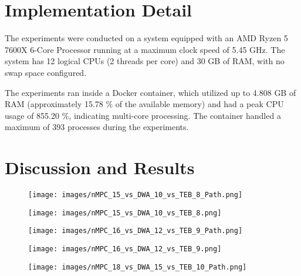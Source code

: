 \documentclass[conference]{IEEEtran}
\begin{document}
\section{Implementation Detail}

The experiments were conducted on a system equipped with an AMD Ryzen 5 7600X 6-Core Processor running at a maximum clock speed of 5.45 GHz. The system has 12 logical CPUs (2 threads per core) and 30 GB of RAM, with no swap space configured.

The experiments ran inside a Docker container, which utilized up to 4.808 GB of RAM (approximately 15.78 \% of the available memory) and had a peak CPU usage of 855.20 \%, indicating multi-core processing. The container handled a maximum of 393 processes during the experiments.

\section{Discussion and Results}

\begin{figure}[!h]
    \centering
    \texttt{[image: images/nMPC\_15\_vs\_DWA\_10\_vs\_TEB\_8\_Path.png]}
    \caption{ }
    \label{fig:nMPC_16_vs_DWA_12_vs_TEB_6_Path}
\end{figure}

\begin{figure}[!h]
    \centering
    \texttt{[image: images/nMPC\_15\_vs\_DWA\_10\_vs\_TEB\_8.png]}
    \caption{ }
    \label{fig:nMPC_16_vs_DWA_12_vs_TEB_6_Path}
\end{figure}

\begin{figure}[!h]
    \centering
    \texttt{[image: images/nMPC\_16\_vs\_DWA\_12\_vs\_TEB\_9\_Path.png]}
    \caption{ }
    \label{fig:nMPC_16_vs_DWA_12_vs_TEB_6_Path}
\end{figure}

\begin{figure}[!h]
    \centering
    \texttt{[image: images/nMPC\_16\_vs\_DWA\_12\_vs\_TEB\_9.png]}
    \caption{ }
    \label{fig:nMPC_16_vs_DWA_12_vs_TEB_6_Path}
\end{figure}


\begin{figure}[!h]
    \centering
    \texttt{[image: images/nMPC\_18\_vs\_DWA\_15\_vs\_TEB\_10\_Path.png]}
    \caption{ }
    \label{fig:nMPC_16_vs_DWA_12_vs_TEB_6_Path}
\end{figure}
\end{document}
